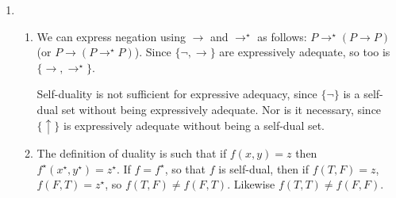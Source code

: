 {\begin{enumerate}
\begin{enumerate}
\begin{itemize}
	\item It cannot be negative (i.e., $f(F,F)=F$), since it would not be able to express those 8 truth functions which are not negative. 
	\item This leaves 4 candidates: \begin{tabular}{cc|cccc}
\toprule
	~ & ~ & $f_{\uparrow}$ & $f_{\text{n-right}}$ & $f_{\text{n-left}}$ & $f_{\downarrow}$ \\
	\midrule
	$T$ & $T$ & $F$ & $F$ & $F$ & $F$\\
	$T$ & $F$ & $T$ & $T$ & $F$ & $F$\\
	$F$ & $T$ & $T$ & $F$ & $T$ & $F$\\
	$F$ & $F$ & $T$ & $T$ & $T$ & $T$\\	
	\bottomrule
\end{tabular}

But $f_{\text{n-left}}$ is the truth-function $f(x,y) =\mathbf{n}(x)$, and $f_{\text{n-right}}$ is the truth-function $f(x,y) =\mathbf{n}(y)$. Neither of these truth-functions is able to express any of the 8 truth functions where $f(F,T)=f(T,F)$.  \end{itemize}
So only the connectives which express $f_{\uparrow}$ and 
	$f_{\downarrow}$ are expressively complete by themselves. 
\item $\bot$ is not expressively adequate by itself, since it is not true in any structure and so cannot express any positive truth-function. However, $\{\to,\bot\}$ is expressively adequate: $(P \to \bot)$ expresses the same truth-function as $\neg P$ (because that conditional expresses the function that yields $F$ iff only if $P$ is true and $\bot$ is false, but since $\bot$ is always false, iff $P$ is true). And it can be easily verified that $((P\to\bot)\to Q)$ expresses disjunction $(P\vee Q)$. And conjunction isn't expressively adequate itself.
\end{enumerate}
\item  \begin{enumerate}
	\item We can express negation using $\to$ and $\to^{\star}$ as follows: $P \to^{\star} (P \to P)$ (or $P \to (P \to^{\star} P)$). Since $\{\neg,\to\}$ are expressively adequate, so too is $\{\to,\to^{\star}\}$.

	Self-duality is not sufficient for expressive adequacy, since $\{¬\}$ is a self-dual set without being expressively adequate. Nor is it necessary, since $\{\uparrow\}$ is expressively adequate without being a self-dual set. 
	\item The definition of duality is such that if $f(x,y) = z$ then $f^{\star}(x^{\star},y^{\star}) = z^{\star}$. If $f =f^{\star}$, so that $f$ is self-dual, then if $f(T,F) = z$, $f(F,T) = z^{\star}$, so $f(T,F)≠f(F,T)$. Likewise $f(T,T)≠f(F,F)$. 


\end{enumerate}
\end{enumerate}}
